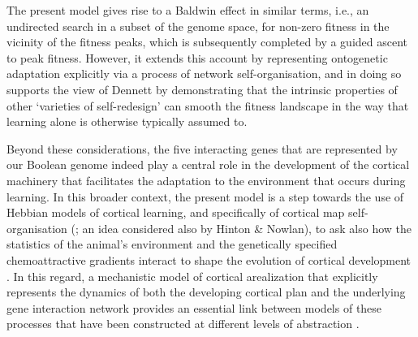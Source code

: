 \documentclass[10pt,letterpaper]{article}
\begin{document}
The present model gives rise to a Baldwin effect in similar terms, i.e., an undirected search in a subset of the genome space, for non-zero fitness in the vicinity of the fitness peaks, which is subsequently completed by a guided ascent to peak fitness. However, it extends this account by representing ontogenetic adaptation explicitly via a process of network self-organisation, and in doing so supports the view of Dennett by demonstrating that the intrinsic properties of other `varieties of self-redesign' can smooth the fitness landscape in the way that learning alone is otherwise typically assumed to. 

Beyond these considerations, the five interacting genes that are represented by our Boolean genome indeed play a central role in the development of the cortical machinery that facilitates the adaptation to the environment that occurs during learning. In this broader context, the present model is a step towards the use of Hebbian models of cortical learning, and specifically of cortical map self-organisation (\cite{Wilson2015,Bednar2016}; an idea considered also by Hinton \& Nowlan), to ask also how the statistics of the animal's environment and the genetically specified chemoattractive gradients interact to shape the evolution of cortical development \cite{Krubitzer2013}. In this regard, a mechanistic model of cortical arealization that explicitly represents the dynamics of both the developing cortical plan and the underlying gene interaction network provides an essential link between models of these processes that have been constructed at different levels of abstraction \cite{Karbowski2004}.
\end{document}

